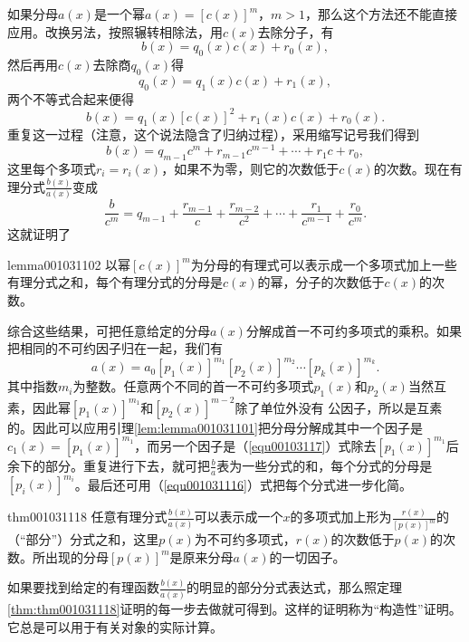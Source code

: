 如果分母$a(x)$是一个幂$a(x)=[c(x)]^m$，$m>1$，那么这个方法还不能直接应用。改换另法，按照辗转相除法，用$c(x)$去除分子，有
\[
b(x)=q_0(x)c(x)+r_0(x),
\]
然后再用$c(x)$去除商$q_0(x)$得
\[
q_0(x)=q_1(x)c(x)+r_1(x),
\]
两个不等式合起来便得
\[
b(x) = q_1(x)[c(x)]^2 + r_1(x)c(x)+r_0(x).
\]
重复这一过程（注意，这个说法隐含了归纳过程），采用缩写记号我们得到
\begin{equation}\label{equ001031115}
b(x) = q_{m-1}c^m + r_{m-1}c^{m-1} + \cdots + r_1c + r_0,
\end{equation}
这里每个多项式$r_i = r_i(x)$，如果不为零，则它的次数低于$c(x)$的次数。现在有理分式$\frac{b(x)}{a(x)}$变成
\begin{equation}\label{equ00103116}
\frac{b}{c^m} = q_{m-1} + \frac{r_{m-1}}{c} + \frac{r_{m-2}}{c^2} + \cdots + \frac{r_1}{c^{m-1}} + \frac{r_0}{c^m}.
\end{equation}
这就证明了
\begin{lemma}{}{lemma001031102}
以幂$[c(x)]^m$为分母的有理式可以表示成一个多项式加上一些有理分式之和，每个有理分式的分母是$c(x)$的幂，分子的次数低于$c(x)$的次数。
\end{lemma}

综合这些结果，可把任意给定的分母$a(x)$分解成首一不可约多项式的乘积。如果把相同的不可约因子归在一起，我们有
\begin{equation}\label{equ001031117}
a(x)=a_0[p_1(x)]^{m_1}[p_2(x)]^{m_2}\cdots[p_k(x)]^{m_k}.
\end{equation}
其中指数$m_i$为整数。任意两个不同的首一不可约多项式$p_1(x)$和$p_2(x)$当然互素，因此幂$[p_1(x)]^{m_1}$和$[p_2(x)]^{m-2}$除了单位外没有 公因子，所以是互素的。因此可以应用引理\ref{lem:lemma001031101}把分母分解成其中一个因子是$c_1(x) = [p_1(x)]^{m_1}$，而另一个因子是（\ref{equ00103117}）式除去$[p_1(x)]^{m_1}$后余下的部分。重复进行下去，就可把$\frac{b}{a}$表为一些分式的和，每个分式的分母是$[p_i(x)]^{m_i}$。最后还可用（\ref{equ001031116}）式把每个分式进一步化简。

\begin{theorem}{}{thm001031118}
任意有理分式$\frac{b(x)}{a(x)}$可以表示成一个$x$的多项式加上形为$\frac{r(x)}{[p(x)]^m}$的（“部分”）分式之和，这里$p(x)$为不可约多项式，$r(x)$的次数低于$p(x)$的次数。所出现的分母$[p(x)]^m$是原来分母$a(x)$的一切因子。
\end{theorem}

如果要找到给定的有理函数$\frac{b(x)}{a(x)}$的明显的部分分式表达式，那么照定理\ref{thm:thm001031118}证明的每一步去做就可得到。这样的证明称为“构造性”证明。它总是可以用于有关对象的实际计算。

